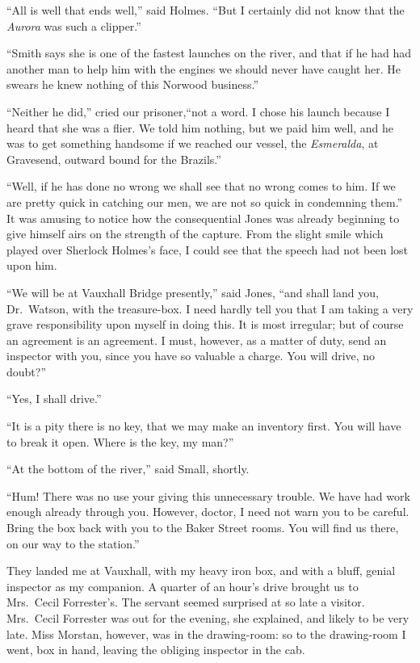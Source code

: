 \documentclass[12pt,english,oneside]{book}
\begin{document}
{}``All is well that ends well,'' said Holmes. {}``But I certainly
did not know that the \emph{Aurora} was such a clipper.''

{}``Smith says she is one of the fastest launches on the river, and
that if he had had another man to help him with the engines we should
never have caught her. He swears he knew nothing of this Norwood business.''

{}``Neither he did,'' cried our prisoner,\mdsh{---}``not a word.
I chose his launch because I heard that she was a flier. We told him
nothing, but we paid him well, and he was to get something handsome
if we reached our vessel, the \emph{Esmeralda}, at Gravesend, outward
bound for the Brazils.''

{}``Well, if he has done no wrong we shall see that no wrong comes
to him. If we are pretty quick in catching our men, we are not so
quick in condemning them.'' It was amusing to notice how the consequential
Jones was already beginning to give himself airs on the strength of
the capture. From the slight smile which played over Sherlock Holmes's
face, I could see that the speech had not been lost upon him.

{}``We will be at Vauxhall Bridge presently,'' said Jones, {}``and
shall land you, Dr.\ Watson, with the treasure-box. I need hardly
tell you that I am taking a very grave responsibility upon myself
in doing this. It is most irregular; but of course an agreement is
an agreement. I must, however, as a matter of duty, send an inspector
with you, since you have so valuable a charge. You will drive, no
doubt?''

{}``Yes, I shall drive.''

{}``It is a pity there is no key, that we may make an inventory first.
You will have to break it open. Where is the key, my man?''

{}``At the bottom of the river,'' said Small, shortly.

{}``Hum! There was no use your giving this unnecessary trouble. We
have had work enough already through you. However, doctor, I need
not warn you to be careful. Bring the box back with you to the Baker
Street rooms. You will find us there, on our way to the station.''

They landed me at Vauxhall, with my heavy iron box, and with a bluff,
genial inspector as my companion. A quarter of an hour's drive brought
us to Mrs.\ Cecil Forrester's. The servant seemed surprised at so
late a visitor. Mrs.\ Cecil Forrester was out for the evening, she
explained, and likely to be very late. Miss Morstan, however, was
in the drawing-room: so to the drawing-room I went, box in hand, leaving
the obliging inspector in the cab.
\end{document}
